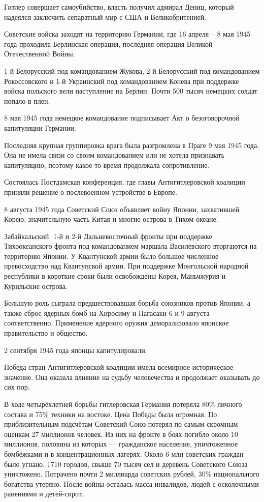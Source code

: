 \documentclass{article}
\begin{document}
Гитлер совершает самоубийство, власть получил адмирал Дениц, который надеялся заключить сепаратный мир с США и Великобритенией.

Советские войска заходят на территорию Германии, где 16 апреля -- 8 мая 1945 года проходила Берлинская операция, последняя операция Великой Отечественной Войны.

1-й Белорусский под командованием Жукова, 2-й Белорусский под командованием Рокоссовского и 1-й Украинский под командованием Конева при поддержке войска польского вели наступление на Берлин. Почти 500 тысяч немецких солдат попало в плен.

8 мая 1945 года немецкое командование подписывает Акт о безоговорочной капитуляции Германии.

Последняя крупная группировка врага была разгромлена в Праге 9 мая 1945 года. Она не имела связи со своим командованием или не хотела признавать капитуляцию, поэтому какое-то время продолжала сопротивление.

Состоялась Постдамская конференция, где главы Антигитлеровской коалиции приняли решение о послевоенном устройстве в Европе.

8 августа 1945 года Советский Союз объявляет войну Японии, захватившей Корею, значительную часть Китая и многие острова в Тихом океане.

Забайкальский, 1-й и 2-й Дальневосточный фронты при поддержке Тихоокеанского фронта под командованием маршала Василевского вторгаются на территорию Японии. У Квантунской армии было большое численное превосходство над Квантунской армии. При поддержке Монгольской народной республики в короткие сроки были освобождены Корея, Маньчжурия и Курильские острова.

Большую роль сыграла предшествовавшая борьба союзников против Японии, а также сброс ядерных бомб на Хиросиму и Нагасаки 6 и 9 августа соответственно. Применение ядерного оружия деморализовало японское правительство и общество.

2 сентября 1945 года японцы капитулировали.

Победа стран Антигитлеровской коалиции имела всемирное историческое значение. Она оказала влияние на судьбу человечества и продолжает оказывать до сих пор.

В ходе четырёхлетней борьбы гитлеровская Германия потеряла 80\% личного состава и 75\% техники на востоке. Цена Победы была огромная. По приблизительным подсчётам Советский Союз потерял по самым скромным оценкам 27 миллионов человек. Из них на фронте в боях погибло около 10 миллионов, половина из которых --- гражданское население, уничтоженное бомбёжками и в концентрационных лагерях. Около 6 млн советских граждан было угнано. 1710 городов, свыше 70 тысяч сёл и деревень Советского Союза уничтожено. Потрачено почти 2 миллиарда советских рублей, 30\% национального богатства утеряно. После войны осталась масса инвалидов, людей с осколочными ранениями и детей-сирот.
\end{document}
